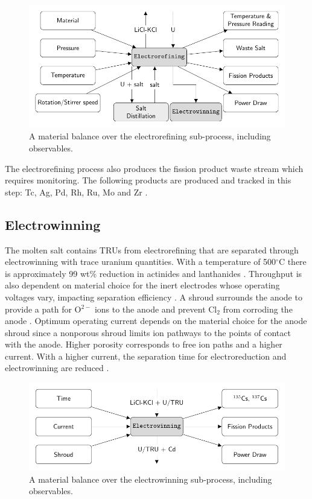 \documentclass{anstrans}
\begin{document}
\begin{figure}[ht]
	\centering
	\includegraphics[width=0.9\linewidth]{refining}
	\caption{A material balance over the electrorefining sub-process, including observables.}
	\label{fig:refining}
\end{figure}

The electrorefining process also produces the fission product waste stream which requires monitoring. The following products are produced 
and tracked in this step: Tc, Ag, Pd, Rh, Ru, Mo and Zr \cite{flowsheet_1998}.

\subsection{Electrowinning}

The molten salt contains TRUs from electrorefining that are separated through electrowinning with trace uranium quantities. 
With a temperature of 500$^{\circ}$C there is approximately 99 wt\% reduction in actinides and lanthanides \cite{flowsheet_1998}. 
Throughput is also dependent on material choice for the inert electrodes whose operating voltages vary, impacting separation 
efficiency \cite{koyama_development_2012}. A shroud surrounds the anode to provide a path for O$^{2-}$ ions to the anode and 
prevent Cl$_2$ from corroding the anode \cite{kim_development_2013,choi_electrochemical_2015}. Optimum operating current 
depends on the material choice for the anode shroud since a nonporous shroud limits ion pathways to the points of contact 
with the anode. Higher porosity corresponds to free ion paths and a higher current. With a higher current, the separation 
time for electroreduction and electrowinning are reduced \cite{choi_electrochemical_2015}.

\begin{figure}[ht]
	\centering
	\includegraphics[width=1\linewidth]{winning}
	\caption{A material balance over the electrowinning sub-process, including observables.}
	\label{fig:winning}
\end{figure}
\end{document}
